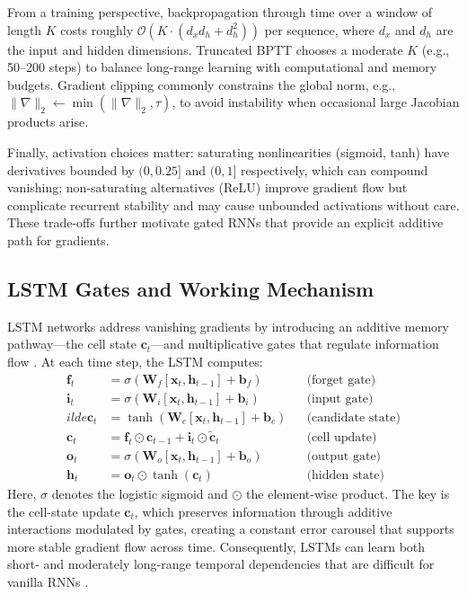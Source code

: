 From a training perspective, backpropagation through time over a window of length \(K\) costs roughly \(\mathcal{O}(K \cdot (d_x d_h + d_h^2))\) per sequence, where \(d_x\) and \(d_h\) are the input and hidden dimensions. Truncated BPTT chooses a moderate \(K\) (e.g., 50--200 steps) to balance long-range learning with computational and memory budgets. Gradient clipping commonly constrains the global norm, e.g., \(\lVert \nabla \rVert_2 \leftarrow \min(\lVert \nabla \rVert_2, \tau)\), to avoid instability when occasional large Jacobian products arise.

Finally, activation choices matter: saturating nonlinearities (sigmoid, tanh) have derivatives bounded by \((0, 0.25]\) and \((0, 1]\) respectively, which can compound vanishing; non-saturating alternatives (ReLU) improve gradient flow but complicate recurrent stability and may cause unbounded activations without care. These trade-offs further motivate gated RNNs that provide an explicit additive path for gradients.

\subsection{LSTM Gates and Working Mechanism}
LSTM networks address vanishing gradients by introducing an additive memory pathway---the cell state \(\mathbf{c}_t\)---and multiplicative gates that regulate information flow \cite{hochreiter1997long}. At each time step, the LSTM computes:
\begin{align}
\mathbf{f}_t &= \sigma(\mathbf{W}_f [\mathbf{x}_t, \mathbf{h}_{t-1}] + \mathbf{b}_f) &&\text{(forget gate)}\\
\mathbf{i}_t &= \sigma(\mathbf{W}_i [\mathbf{x}_t, \mathbf{h}_{t-1}] + \mathbf{b}_i) &&\text{(input gate)}\\
	ilde{\mathbf{c}}_t &= \tanh(\mathbf{W}_c [\mathbf{x}_t, \mathbf{h}_{t-1}] + \mathbf{b}_c) &&\text{(candidate state)}\\
\mathbf{c}_t &= \mathbf{f}_t \odot \mathbf{c}_{t-1} + \mathbf{i}_t \odot \tilde{\mathbf{c}}_t &&\text{(cell update)}\\
\mathbf{o}_t &= \sigma(\mathbf{W}_o [\mathbf{x}_t, \mathbf{h}_{t-1}] + \mathbf{b}_o) &&\text{(output gate)}\\
\mathbf{h}_t &= \mathbf{o}_t \odot \tanh(\mathbf{c}_t) &&\text{(hidden state)}
\end{align}
Here, \(\sigma\) denotes the logistic sigmoid and \(\odot\) the element-wise product. The key is the cell-state update \(\mathbf{c}_t\), which preserves information through additive interactions modulated by gates, creating a constant error carousel that supports more stable gradient flow across time. Consequently, LSTMs can learn both short- and moderately long-range temporal dependencies that are difficult for vanilla RNNs \cite{hochreiter1997long}.

